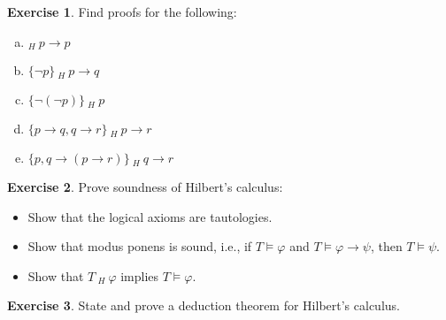\documentclass{amsart}
\theoremstyle{definition}
\newtheorem{problem}{Exercise}
\begin{document}
\bigskip

\begin{problem}
Find proofs for the following:
\begin{enumerate}[(a)]
\item $_H\ p\to p$
\item $\{\neg p\}\ _H\ p\to q$
\item $\{\neg(\neg p)\}\ _H\ p$
\item $\{p\to q,q \to r\}\ _H\ p\to r$
\item $\{p, q \to (p\to r)\}\ _H\ q\to r$

\end{enumerate}
\end{problem}\medskip


\begin{problem}
Prove soundness of Hilbert's calculus:
\begin{itemize}
    \item Show that the logical axioms are tautologies.
    \item Show that modus ponens is sound, i.e., if $T\models\varphi$ and $T\models\varphi\to\psi$, then $T\models\psi$.
    \item Show that $T\ _H\ \varphi$ implies $T\models\varphi$.
\end{itemize}
\end{problem}\medskip

\begin{problem}
State and prove a deduction theorem for Hilbert's calculus.
\end{problem}\medskip

\end{document}
